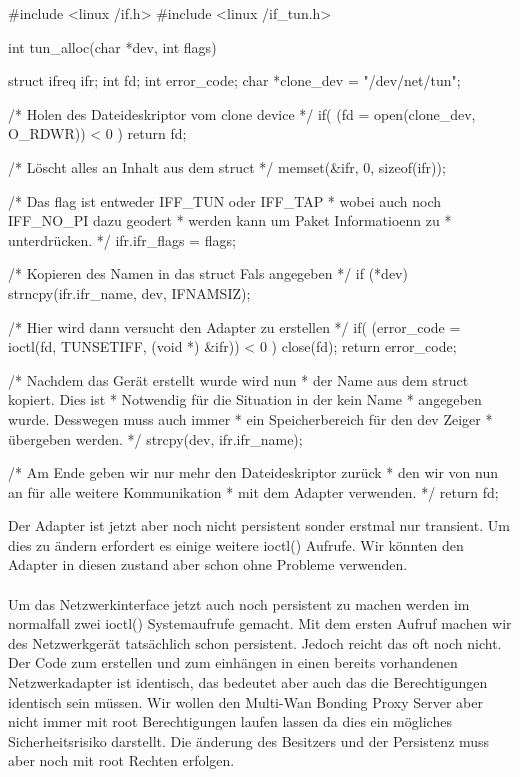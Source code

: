 \begin{program}[H]
    \begin{CppCode}
        #include <linux /if.h>
        #include <linux /if_tun.h>
        
        int tun_alloc(char *dev, int flags) {
          struct ifreq ifr;
          int fd;
          int error_code;
          char *clone_dev = "/dev/net/tun";
        
           /* Holen des Dateideskriptor vom clone device */
           if( (fd = open(clone_dev, O_RDWR)) < 0 ) {
             return fd;
           }
        
           /* Löscht alles an Inhalt aus dem struct */
           memset(&ifr, 0, sizeof(ifr));
        
           /* Das flag ist entweder IFF_TUN oder IFF_TAP
            * wobei auch noch IFF_NO_PI dazu geodert 
            * werden kann um Paket Informatioenn zu 
            * unterdrücken.
            */
           ifr.ifr_flags = flags;   
        
           /* Kopieren des Namen in das struct Fals angegeben */
           if (*dev) {
             strncpy(ifr.ifr_name, dev, IFNAMSIZ);
           }
        
           /* Hier wird dann versucht den Adapter zu erstellen */
           if( (error_code = ioctl(fd, TUNSETIFF, (void *) &ifr)) < 0 ) {
             close(fd);
             return error_code;
           }
        
          /* Nachdem das Gerät erstellt wurde wird nun
           * der Name aus dem struct kopiert. Dies ist 
           * Notwendig für die Situation in der kein Name
           * angegeben wurde. Desswegen muss auch immer 
           * ein Speicherbereich für den dev Zeiger 
           * übergeben werden.
           */
          strcpy(dev, ifr.ifr_name);
        
          /* Am Ende geben wir nur mehr den Dateideskriptor zurück 
           * den wir von nun an für alle weitere Kommunikation
           * mit dem Adapter verwenden.
           */
          return fd;
        }
    \end{CppCode}
\end{program}
\noindent
Der Adapter ist jetzt aber noch nicht persistent sonder erstmal nur transient. Um dies zu ändern erfordert es einige weitere ioctl() Aufrufe. Wir könnten den Adapter in diesen zustand aber schon ohne Probleme verwenden.
\\\\
Um das Netzwerkinterface jetzt auch noch persistent zu machen werden im normalfall zwei ioctl() Systemaufrufe gemacht. Mit dem ersten Aufruf machen wir des Netzwerkgerät tatsächlich schon persistent. Jedoch reicht das oft noch nicht. Der Code zum erstellen und zum einhängen in einen bereits vorhandenen Netzwerkadapter ist identisch, das bedeutet aber auch das die Berechtigungen identisch sein müssen. Wir wollen den Multi-Wan Bonding Proxy Server aber nicht immer mit root Berechtigungen laufen lassen da dies ein mögliches Sicherheitsrisiko darstellt. Die änderung des Besitzers und der Persistenz muss aber noch mit root Rechten erfolgen.
